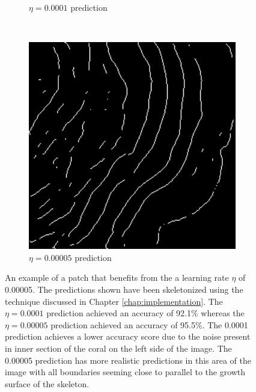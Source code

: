\begin{figure}[!t]
\begin{subfigure}[t]{0.32\textwidth}
        \caption{$\eta=0.0001$ prediction}
    \end{subfigure}
    ~
    \begin{subfigure}[t]{0.32\textwidth}
        \centering
        \includegraphics[width=1\textwidth, valign=c]{images/5e5-example.png}
        \caption{$\eta=0.00005$ prediction}
    \end{subfigure}
    \caption{An example of a patch that benefits from the a learning rate $\eta$ of 0.00005. The predictions shown have been skeletonized using the technique discussed in Chapter \ref{chap:implementation}. The $\eta=0.0001$ prediction achieved an accuracy of 92.1\% whereas the $\eta=0.00005$ prediction achieved an accuracy of 95.5\%. The 0.0001 prediction achieves a lower accuracy score due to the noise present in inner section of the coral on the left side of the image. The 0.00005 prediction has more realistic predictions in this area of the image with all boundaries seeming close to parallel to the growth surface of the skeleton.}
    \label{fig:lrdiff}
\end{figure}

